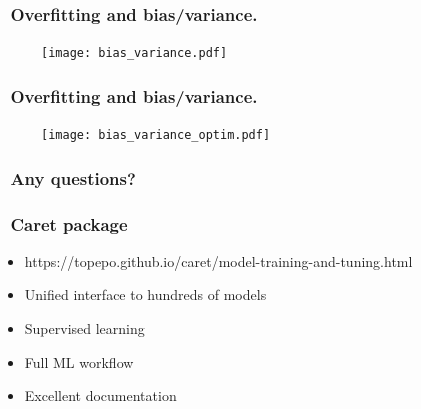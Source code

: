 \documentclass[handout, aspectratio = 169]{beamer}
\begin{document}
\begin{frame}
\frametitle{\insertframenumber~Overfitting and bias/variance.}

\begin{figure}
    \texttt{[image: bias\_variance.pdf]}
\end{figure} 

\end{frame} 


\begin{frame}
\frametitle{\insertframenumber~Overfitting and bias/variance.}

\begin{figure}
    \texttt{[image: bias\_variance\_optim.pdf]}
\end{figure} 

\end{frame} 



\begin{frame}
\frametitle{\insertframenumber~Any questions?}


\end{frame} 

































\begin{frame}
\frametitle{\insertframenumber~Caret package}
\begin{itemize}
\item https://topepo.github.io/caret/model-training-and-tuning.html
\item Unified interface to hundreds of models
\item Supervised learning
\item Full ML workflow
\item Excellent documentation


\end{itemize}

\end{frame} 
\end{document}
